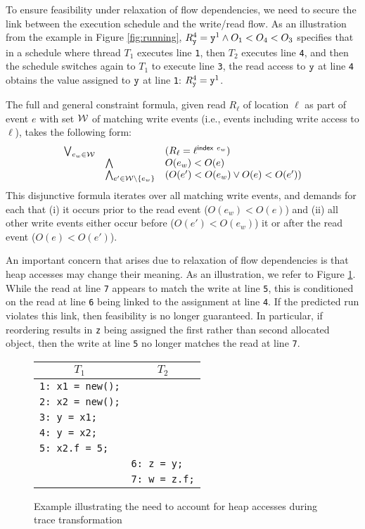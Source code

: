 To ensure feasibility under relaxation of flow dependencies, we need to secure the link between the execution schedule and the write/read flow. As an illustration from the example in Figure \ref{fig:running}, $R_{\tt y}^4={\tt y}^1 \wedge O_1 < O_4 < O_3$ specifies that in a schedule where thread $T_1$ executes line {\tt 1}, then $T_2$ executes line {\tt 4}, and then the schedule switches again to $T_1$ to execute line {\tt 3}, the read access to ${\tt y}$ at line {\tt 4} obtains the value assigned to ${\tt y}$ at line {\tt 1}: $R_{\tt y}^4={\tt y}^1$.

The full and general constraint formula, given read $R_{\ell}$ of location $\ell$ as part of event $e$ with set ${\cal W}$ of matching write events (i.e., events including write access to $\ell$), takes the following form:
$$
\begin{array}{rll}
\bigvee_{e_w \in {\cal W}} &  & (R_{\ell} = {\ell}^{{\sf index}\ e_w}) \\
&		\bigwedge 	&  O(e_w) < O(e) \\
&		\bigwedge_{e' \in {\cal W} \setminus \{ e_w \}} & (O(e') < O(e_w) \vee O(e) < O(e'))
\end{array}
$$
This disjunctive formula iterates over all matching write events, and demands for each that (i) it occurs prior to the read event ($O(e_w) < O(e)$) and (ii) all other write events either occur before ($O(e') < O(e_w)$) it or after the read event
($O(e) < O(e')$).

An important concern that arises due to relaxation of flow dependencies is that heap accesses may change their meaning. As an illustration, we refer to Figure \ref{fig:heapAccess}. While the read at line {\tt 7} appears to match the write at line {\tt 5}, this is conditioned on the read at line {\tt 6} being linked to the assignment at line {\tt 4}. If the predicted run violates this link, then feasibility is no longer guaranteed. In particular, if reordering results in {\tt z} being assigned the first rather than second allocated object, then the write at line {\tt 5} no longer matches the read at line {\tt 7}.

\begin{figure}
	\centering
	\begin{tabular}{ll}
		\hline
		\multicolumn{1}{c}{$T_1$} & \multicolumn{1}{c}{$T_2$} \\
		\hline
		{\tt 1: x1 = new();} & \\
		{\tt 2: x2 = new();} & \\
		{\tt 3: y = x1;} & \\
		{\tt 4: y = x2;} & \\
		{\tt 5: x2.f = 5;} & \\	
		& {\tt 6: z = y;} \\
		& {\tt 7: w = z.f;} \\
	\end{tabular}
	\caption{\label{fig:heapAccess}Example illustrating the need to account for heap accesses during trace transformation}
\end{figure}

